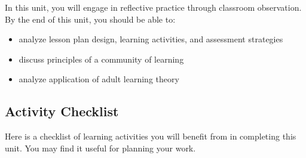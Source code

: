 \documentclass[
]{book}
\providecommand{\tightlist}{%
  \setlength{\itemsep}{0pt}\setlength{\parskip}{0pt}}
\begin{document}
In this unit, you will engage in reflective practice through classroom observation. By the end of this unit, you should be able to:

\begin{itemize}
\tightlist
\item
  analyze lesson plan design, learning activities, and assessment strategies\\
\item
  discuss principles of a community of learning\\
\item
  analyze application of adult learning theory
\end{itemize}

\hypertarget{activity-checklist-2}{%
\subsection*{Activity Checklist}\label{activity-checklist-2}}

Here is a checklist of learning activities you will benefit from in completing this unit. You may find it useful for planning your work.
\end{document}
